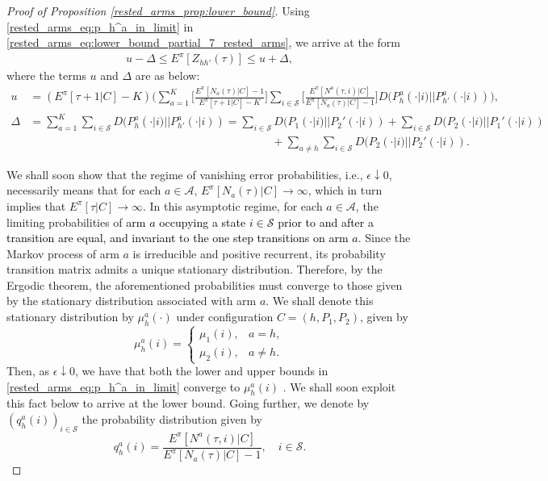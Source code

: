 \begin{proof}[Proof of Proposition \ref{rested_arms_prop:lower_bound}]
Using \eqref{rested_arms_eq:p_h^a_in_limit} in \eqref{rested_arms_eq:lower_bound_partial_7_rested_arms}, we arrive at the form
\begingroup\allowdisplaybreaks\begin{align}
	u-\Delta\leq E^\pi[Z_{hh'}(\tau)]
	\leq u+\Delta,\label{rested_arms_eq:lower_bound_partial_8}
\end{align}\endgroup
where the terms $u$ and $\Delta$ are as below:
\begingroup\allowdisplaybreaks\begin{align}
u&=(E^\pi[\tau+1|C]-K)
\bigg(\sum\limits_{a=1}^{K}\bigg[\frac{E^\pi[N_a(\tau)|C]-1}{E^\pi[\tau+1|C]-K}\bigg]
\sum\limits_{i\in \mathcal{S}}\bigg[\frac{E^\pi[N^a(\tau,i)|C]}{E^\pi[N_a(\tau)|C]-1}\bigg] D(P_h^a(\cdot|i)||P_{h'}^a(\cdot|i))\bigg),\nonumber\\
\Delta &=\sum\limits_{a=1}^{K}\sum\limits_{i\in\mathcal{S}}D(P_h^a(\cdot|i)||P_{h'}^a(\cdot|i))
=\sum\limits_{i\in\mathcal{S}}D(P_1(\cdot|i)||P_2'(\cdot|i))+\sum\limits_{i\in\mathcal{S}}D(P_2(\cdot|i)||P_1'(\cdot|i))
\nonumber\\
&\hspace{9cm}+\sum\limits_{a\neq h}\sum\limits_{i\in\mathcal{S}}D(P_2(\cdot|i)||P_2'(\cdot|i)).
\end{align}\endgroup

We shall soon show that the regime of vanishing error probabilities, i.e., $\epsilon\downarrow 0$, necessarily means that for each $a\in\mathcal{A}$, $E^\pi[N_a(\tau)|C]\to \infty$, which in turn implies that $E^\pi[\tau|C]\to\infty$. In this asymptotic regime, for each $a\in\mathcal{A}$, the limiting probabilities of \textcolor{black}{arm $a$ occupying a state $i\in \mathcal{S}$ prior to and after a transition are equal, and invariant to the one step transitions on arm $a$}. Since the Markov process of arm $a$ is irreducible and positive recurrent, its probability transition matrix admits a unique stationary distribution. Therefore, by the Ergodic theorem, the aforementioned probabilities must converge to those given by the stationary distribution associated with arm $a$. We shall denote this stationary distribution by $\mu_h^a(\cdot)$ under configuration $C=(h,P_1,P_2)$, given by
\begin{equation}
	\mu_h^a(i)=\begin{cases}
		\mu_1(i),&a=h,\\
		\mu_2(i),&a\neq h.
	\end{cases}\label{rested_arms_eq:mu_h^a}
\end{equation}
Then, as $\epsilon\downarrow 0$, we have that both the lower and upper bounds in \eqref{rested_arms_eq:p_h^a_in_limit} converge to $\mu_h^a(i)$ . We shall soon exploit this fact below to arrive at the lower bound. Going further, we denote by $(q_h^a(i))_{i\in\mathcal{S}}$ the probability distribution given by
\begin{equation}
q_h^a(i)=\frac{E^\pi[N^a(\tau,i)|C]}{E^\pi[N_a(\tau)|C]-1},\quad i\in\mathcal{S}.\label{rested_arms_eq:q_h^a}	
\end{equation}


\end{proof}
